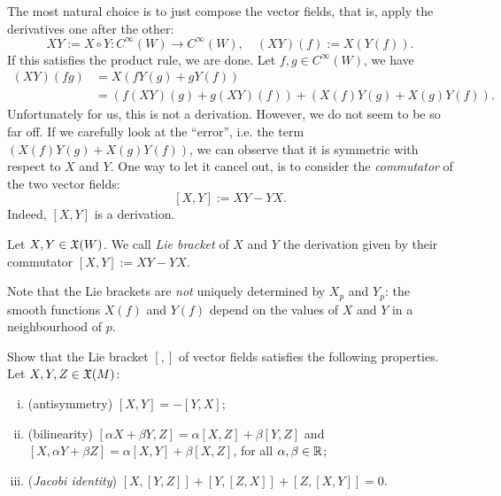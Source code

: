The most natural choice is to just compose the vector fields, that is, apply the derivatives one after the other:
\begin{equation}
  X Y := X \circ Y : C^\infty(W) \to C^\infty(W), \quad
  (X Y)(f) := X(Y(f)).
\end{equation}
If this satisfies the product rule, we are done.
Let $f,g\in C^\infty(W)$, we have
\begin{align}
  (X Y)(fg) &= X(fY(g) + gY(f)) \\
  &= \left(f(X Y)(g) + g(X Y)(f)\right) + \left( X(f)Y(g) +X(g)Y(f)\right).
\end{align}
Unfortunately for us, this is not a derivation. However, we do not seem to be so far off.
If we carefully look at the ``error'', i.e. the term $\left( X(f)Y(g) +X(g)Y(f)\right)$, we can observe that it is symmetric with respect to $X$ and $Y$.
One way to let it cancel out, is to consider the \emph{commutator} of the two vector fields:
\begin{equation}\label{def:commutator}
    [X,Y] := X Y - Y X.
\end{equation}
Indeed, $[X,Y]$ is a derivation.

\begin{definition}
    Let $X,Y\in\mathfrak{X}(W)$. We call \emph{Lie bracket} of $X$ and $Y$ the derivation given by their commutator $[X,Y] := X Y - Y X$.
\end{definition}

\begin{remark}
  Note that the Lie brackets are \emph{not} uniquely determined by $X_p$ and $Y_p$: the smooth functions $X(f)$ and $Y(f)$ depend on the values of $X$ and $Y$ in a neighbourhood of $p$.
\end{remark}

\begin{exercise}\label{ex:vfliealgebra}
  Show that the Lie bracket $[,]$ of vector fields satisfies the following properties. Let $X,Y,Z\in\mathfrak{X}(M)$:
  \begin{enumerate}[(i)]
    \item (antisymmetry) $[X, Y] = - [Y, X]$;
    \item (bilinearity) $[\alpha X + \beta Y, Z] = \alpha [X, Z] + \beta [Y, Z]$ and $[X, \alpha Y + \beta Z] = \alpha [X, Y] + \beta [X, Z]$, for all $\alpha,\beta \in\mathbb{R}$;
    \item (\emph{Jacobi identity}) $[X,[Y,Z]] + [Y,[Z,X]] + [Z,[X,Y]] = 0$.
  \end{enumerate}
\end{exercise}

